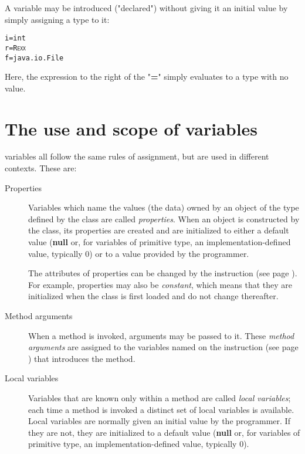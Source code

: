 A variable may be introduced ("declared") without giving it an
initial value by simply assigning a type to it:
\begin{alltt}
i=int
r=R\textsc{exx}
f=java.io.File
\end{alltt}
Here, the expression to the right of the "\textbf{=}" simply
evaluates to a type with no value.
\section{The use and scope of variables}
 
\nr{} variables all follow the same rules of assignment, but are used
in different contexts.  These are:
\begin{description}
\item[Properties]\label{refprops}

Variables which name the values (the data) owned by an object of the
type defined by the class are called \emph{properties}.
When an object is constructed by the class, its properties are created
and are initialized to either a default value
(\textbf{null} or, for variables of primitive type, an
implementation-defined value, typically 0)
or to a value provided by the programmer.
 
The attributes of properties can be changed by the
 instruction (see page \pageref{refprop}).
For example, properties may also be \emph{constant}, which means
that they are initialized when the class is first loaded and do not
change thereafter.
\item[Method arguments]

When a method is invoked, arguments may be passed to it.
These \emph{method arguments} are assigned to the variables named on
the   instruction (see page \pageref{refmethod})  that introduces the
method.
\item[Local variables]

Variables that are known only within a method are called \emph{local
variables}; each time a method is invoked a distinct set of local
variables is available.
Local variables are normally given an initial value by the programmer.
If they are not, they are initialized to a default value
(\textbf{null} or, for variables of primitive type, an
implementation-defined value, typically 0).
\end{description}
 
